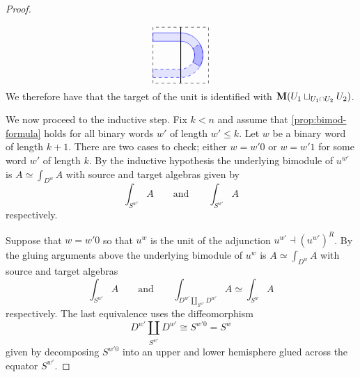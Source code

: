 \documentclass[10pt, reqno, twoside
, final
]{amsart}
\numberwithin{equation}{subsection}%
\theoremstyle{definition}
\theoremstyle{definition}
\theoremstyle{definition}
\theoremstyle{definition}
\theoremstyle{definition}
\theoremstyle{definition}
\theoremstyle{definition}
\theoremstyle{definition}
\theoremstyle{definition}
\theoremstyle{plain}
\theoremstyle{definition}
\theoremstyle{plain}
\theoremstyle{definition}
\theoremstyle{plain}
\theoremstyle{definition}
\theoremstyle{definition}
\theoremstyle{plain}
\theoremstyle{plain}
\theoremstyle{definition}
\theoremstyle{plain}
\theoremstyle{plain}
\theoremstyle{plain}
\begin{document}
\begin{proof}
\begin{equation*}
\begin{tikzpicture}[baseline=0.9cm]
    \draw[dashed] (-1,-1) rectangle (1,1);
    \draw[thick] (0,1) -- (0,-1);
    \fill[blue,opacity=0.1] (-1,-0.8) -- (0,-0.8) arc[start angle = -90, end angle = 90,radius = 0.8]  
    -- (-1,0.8) -- (-1,0.5) -- (0,0.5) arc[start angle = 90, end angle = -90,radius = 0.5] 
    -- (-1,-0.5) -- (-1,-0.8);
    \draw[blue,dashed] (-1,-0.8) -- (0,-0.8) arc[start angle = -90, end angle = 30,radius = 0.8]  
    -- (30:{0.5}) arc[start angle = 30, end angle = -90,radius = 0.5] -- (-1,-0.5) -- (-1,-0.8);
    \draw[blue] (-1,0.8) -- (-1,0.5) -- (0,0.5) arc[start angle = 90, end angle = -30,radius = 0.5] 
    -- (-30:{0.8}) arc[start angle = -30, end angle = 90,radius = 0.8] -- (-1,0.8) ;
    \fill[blue,opacity=0.2] (30:{0.5}) arc[start angle = 30, end angle = -30,radius = 0.5] 
    -- (-30:{0.8}) arc[start angle = -30, end angle = 30,radius = 0.8] -- (30:{0.5}) ;
\end{tikzpicture}
\end{equation*}
We therefore have that the target of the unit is identified with $\mathbf{M}(U_1 \sqcup_{U_1 \cap U_2} U_2)$.

We now proceed to the inductive step. Fix $k<n$ and assume that \cref{prop:bimod-formula} holds for all binary words $w'$ of length $w' \leq k$. Let $w$ be a binary word of length $k+1$. There are two cases to check; either $w = w'0$ or $w=w'1$ for some word $w'$ of length $k$. By the inductive hypothesis the underlying bimodule of $u^{w'}$ is $A \simeq \int_{D^w} A$ with source and target algebras given by
\begin{equation}
    \int_{S^{w'}} A \qquad \text{and} \qquad {\int_{S^{\overline{w'}}} A}
\end{equation}
respectively.

Suppose that $w = w'0$ so that $u^w$ is the unit of the adjunction $u^{w'} \dashv (u^{w'})^R$. By the gluing arguments above the underlying bimodule of $u^w$ is $A \simeq \int_{D^w} A$ with source and target algebras
\begin{equation}
    \int_{S^{w'}} A \qquad \text{and} \qquad \int_{D^{w'} \coprod_{S^{\overline{w'}}} D^{w'}} A \simeq \int_{S^{\overline{w}}} A  \label{eq:case1-1}
\end{equation}
respectively. The last equivalence uses the diffeomorphism
\begin{equation*}
    D^{w'} \coprod_{S^{\overline{w'}}} D^{w'}\cong S^{w'0} = S^{\overline{w}}
\end{equation*}
given by decomposing $S^{w'0}$ into an upper and lower hemisphere glued across the equator $S^{w'}$.


\end{proof}
\end{document}
